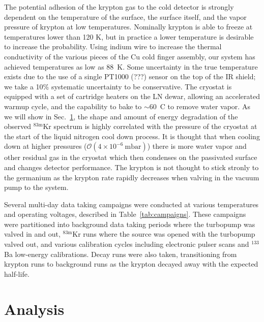 \documentclass[nofootinbib,superscriptaddress, aps, prc, 
10pt, amsmath, amssymb, bibnotes,
altaffilletter, twocolumn, floatfix]{revtex4-2}
\def\kr83{{${}^{83\mathrm{m}}$Kr}}
\begin{document}
    The potential adhesion of the krypton gas to the cold detector is strongly dependent on the temperature of the surface, the surface itself, and the vapor pressure of krypton at low temperatures.
    Nominally krypton is able to freeze at temperatures lower than 120 K, but in practice a lower temperature is desirable to increase the probability.
    Using indium wire to increase the thermal conductivity of the various pieces of the Cu cold finger assembly, our system has achieved temperatures as low as 88~K.
    Some uncertainty in the true temperature exists due to the use of a single PT1000 (???) sensor on the top of the IR shield; we take a 10\% systematic uncertainty to be conservative.
    The cryostat is equipped with a set of cartridge heaters on the LN dewar, allowing an accelerated warmup cycle, and the capability to bake to $\sim$60~C to remove water vapor.     
    As we will show in Sec.~\ref{sec:analysis}, the shape and amount of energy degradation of the observed \kr83 spectrum is highly correlated with the pressure of the cryostat at the start of the liquid nitrogen cool down process. It is thought that when cooling down at higher pressures ($\mathcal{O}(4 \times 10^{-6}~\mathrm{mbar})$) there is more water vapor and other residual gas in the cryostat which then condenses on the passivated surface and changes detector performance. The krypton is not thought to stick stronly to the germanium as the krypton rate rapidly decreases when valving in the vacuum pump to the system.

    Several multi-day data taking campaigns were conducted at various temperatures and operating voltages, described in Table~\ref{tab:campaigns}.
    These campaigns were partitioned into background data taking periods where the turbopump was valved in and out, \kr83 runs where the source was opened with the turbopump valved out, and various calibration cycles including electronic pulser scans and $^{133}$Ba low-energy calibrations. Decay runs were also taken, transitioning from krypton runs to background runs as the krypton decayed away with the expected half-life. 

    

\section{Analysis} \label{sec:analysis}
\end{document}
